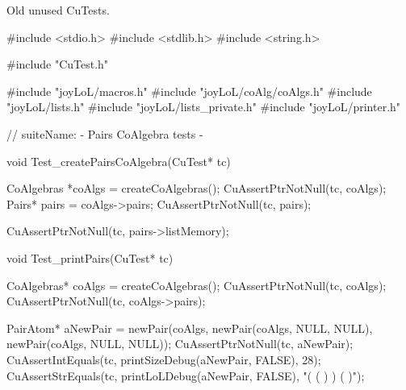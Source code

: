 Old unused CuTests.

\starttyping
#include <stdio.h>
#include <stdlib.h>
#include <string.h>

#include "CuTest.h"

#include "joyLoL/macros.h"
#include "joyLoL/coAlg/coAlgs.h"
#include "joyLoL/lists.h"
#include "joyLoL/lists_private.h"
#include "joyLoL/printer.h"

// suiteName: - Pairs CoAlgebra tests -

void Test_createPairsCoAlgebra(CuTest* tc) {
  CoAlgebras *coAlgs = createCoAlgebras();
  CuAssertPtrNotNull(tc, coAlgs);
  Pairs* pairs = coAlgs->pairs;
  CuAssertPtrNotNull(tc, pairs);

  CuAssertPtrNotNull(tc, pairs->listMemory);
}

void Test_printPairs(CuTest* tc) {
  CoAlgebras* coAlgs = createCoAlgebras();
  CuAssertPtrNotNull(tc, coAlgs);
  CuAssertPtrNotNull(tc, coAlgs->pairs);

  PairAtom* aNewPair = newPair(coAlgs,
                               newPair(coAlgs, NULL, NULL),
                               newPair(coAlgs, NULL, NULL));
  CuAssertPtrNotNull(tc, aNewPair);
  CuAssertIntEquals(tc, printSizeDebug(aNewPair, FALSE), 28);
  CuAssertStrEquals(tc, printLoLDebug(aNewPair, FALSE), "( ( ) ) ( )");
}
\stoptyping
